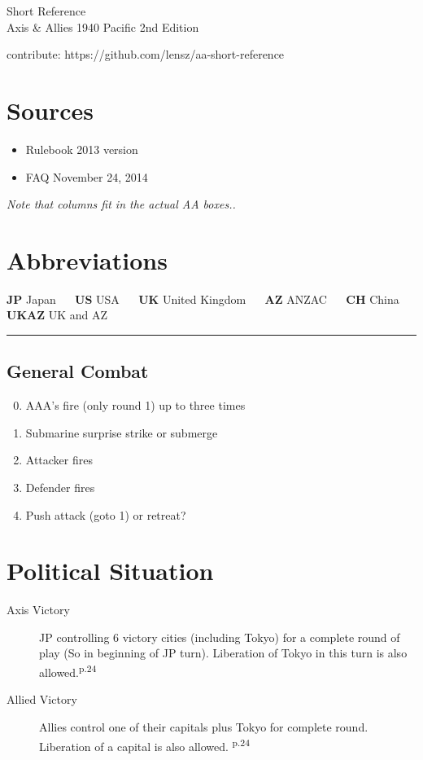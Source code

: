 \documentclass[10pt,a4paper,landscape]{article}
\begin{document}
\begin{multicols*}{3}
\begin{center}
{\Large Short Reference}\\
\vspace{.2cm}
{\large Axis \& Allies 1940 Pacific 2nd Edition}

\vspace{.5cm}
contribute: https://github.com/lensz/aa-short-reference
\end{center}

\section*{{\normalsize Sources}}
\begin{itemize}
\item Rulebook 2013 version
\item FAQ November 24, 2014
\end{itemize}

\noindent\textsl{Note that columns fit in the actual AA boxes..}

\section*{{\normalsize Abbreviations}}
\textbf{JP} Japan ~~ \textbf{US} USA ~~ \textbf{UK} United Kingdom ~~ \textbf{AZ} ANZAC ~~ \textbf{CH} China ~~ \textbf{UKAZ} UK and AZ



\noindent\rule{7.5cm}{0.4pt}

\subsection*{General Combat}
\begin{enumerate}
\setcounter{enumi}{-1}
\item AAA's fire (only round 1) up to three times
\item Submarine surprise strike or submerge
\item Attacker fires
\item Defender fires
\item Push attack (goto 1) or retreat?
\end{enumerate}

\section*{Political Situation}
\begin{description}
\item[Axis Victory] JP controlling 6 victory cities (including Tokyo) for a complete round of play (So in beginning of JP turn). Liberation of Tokyo in this turn is also allowed.\textsuperscript{p.24}
\item[Allied Victory] Allies control one of their capitals plus Tokyo for complete round. Liberation  of a capital is also allowed. \textsuperscript{p.24}
\end{description}


\end{multicols*}
\end{document}
